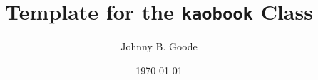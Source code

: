 \documentclass[
    fontsize=10pt,
    twoside=true,
    secnumdepth=1,
    numbers=noenddot,
]{kaobook}
\begin{document}

\titlehead{Document Template}

\title[Template for the {\normalfont\texttt{kaobook}} Class]{Template for the {\normalfont\texttt{kaobook}} Class}

\author[JBG]{Johnny B. Goode}

\date{\today}

\publishers{An Awesome Publisher}


\frontmatter %




\makeatletter
\uppertitleback{\@titlehead} %
\end{document}
